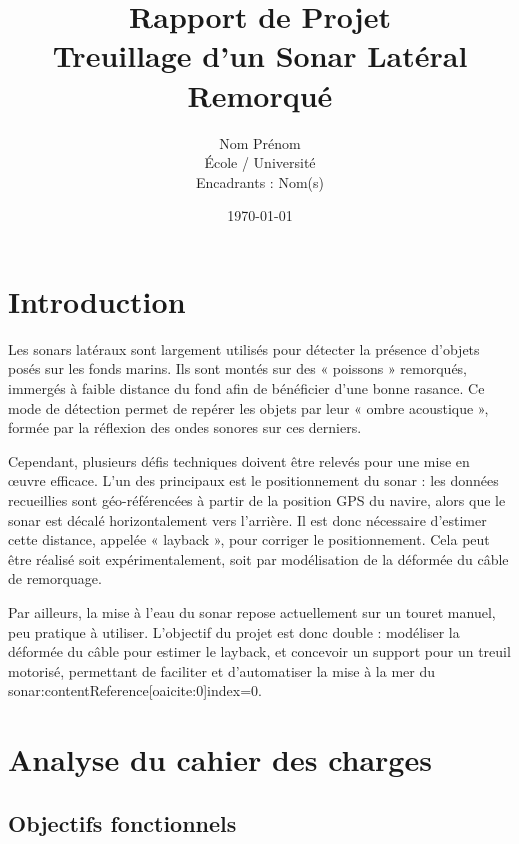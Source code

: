 \documentclass[12pt,a4paper]{article}
\title{\textbf{Rapport de Projet} \\
\vspace{0.3cm}
\large Treuillage d’un Sonar Latéral Remorqué}
\author{Nom Prénom \\
École / Université \\
Encadrants : Nom(s)}
\date{\today}
\begin{document}
\maketitle
\tableofcontents
\newpage

\section{Introduction}


Les sonars latéraux sont largement utilisés pour détecter la présence d’objets posés sur les fonds marins. Ils sont montés sur des « poissons » remorqués, immergés à faible distance du fond afin de bénéficier d’une bonne rasance. Ce mode de détection permet de repérer les objets par leur « ombre acoustique », formée par la réflexion des ondes sonores sur ces derniers.

Cependant, plusieurs défis techniques doivent être relevés pour une mise en œuvre efficace. L’un des principaux est le positionnement du sonar : les données recueillies sont géo-référencées à partir de la position GPS du navire, alors que le sonar est décalé horizontalement vers l’arrière. Il est donc nécessaire d’estimer cette distance, appelée « layback », pour corriger le positionnement. Cela peut être réalisé soit expérimentalement, soit par modélisation de la déformée du câble de remorquage.

Par ailleurs, la mise à l’eau du sonar repose actuellement sur un touret manuel, peu pratique à utiliser. L’objectif du projet est donc double : modéliser la déformée du câble pour estimer le layback, et concevoir un support pour un treuil motorisé, permettant de faciliter et d’automatiser la mise à la mer du sonar:contentReference[oaicite:0]{index=0}.



\section{Analyse du cahier des charges}

\subsection{Objectifs fonctionnels}
\end{document}

